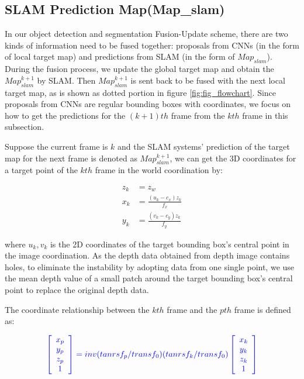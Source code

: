 \documentclass[conference]{IEEEtran}
\begin{document}
\subsection{\textbf{SLAM Prediction Map(Map\_slam)}}

In our object detection and segmentation Fusion-Update scheme, there are two kinds of information need to be fused together: proposals from CNNs (in the form of local target map) and predictions from SLAM (in the form of $Map_{slam}$). During the fusion process, we update the global target map and obtain the $Map^{k+1}_{slam}$ by SLAM. Then $Map^{k+1}_{slam}$ is sent back to be fused with the next local target map, as is shown as dotted portion in figure \ref{fig:fig_flowchart}. Since proposals from CNNs are regular bounding boxes with coordinates, we focus on  how to get the predictions for the $(k+1)th$ frame from the $kth$ frame in this subsection.

Suppose the current frame is $k$ and the SLAM systems' prediction of the target map for the next frame is denoted as $Map^{k+1}_{slam}$, we can get the 3D coordinates for a target point of the $kth$ frame in the world coordination by:
\begin{small}
	\color{blue}
	\begin{align}
	z_{k}&=z_{w} \\
	x_{k}&=\frac{(u_{k}-c_{x})z_{k}}{f_{x}} \\
	y_{k}&=\frac{(v_{k}-c_{y})z_{k}}{f_{y}} 
	\end{align}
\end{small}
where $u_{k}, v_{k}$ is the 2D coordinates of the target bounding box's central point in the image coordination. As the depth data obtained from depth image contains holes, to eliminate the instability by adopting data from one single point,  we use the mean depth value of a small patch around the target bounding box's central point to replace the original depth data. 

The coordinate relationship between the $kth$ frame and  the $pth$ frame is defined as:
\begin{small}
	\begin{equation}
	\color{blue}
	\left[\begin{array}{c}
	x_{p}\\
	y_{p}\\
	z_{p}\\
	1
	\end{array}
	\right]
	=inv(tanrsf_{p} / transf_{0})(tanrsf_{k} / transf_{0})
	\left[\begin{array}{c}
	x_{k}\\
	y_{k}\\
	z_{k}\\
	1
	\end{array}
	\right]
	\end{equation}
\end{small}
\end{document}

